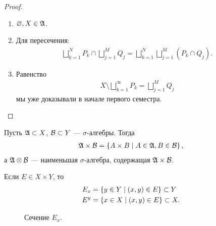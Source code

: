 \begin{proof}\
 \begin{enumerate}
  \item $\varnothing, X \in \mathfrak{A}$.
  \item Для пересечения: \begin{align*}
   \bigsqcup_{k=1}^{N} P_k \cap \bigsqcup_{j=1}^{M} Q_j = \bigsqcup_{k=1}^{N} \bigsqcup_{j=1}^{M} (P_k \cap Q_j)
  .\end{align*} 
 \item Равенство \begin{align*}
  X \setminus \bigsqcup_{k=1}^{\infty} P_k = \bigsqcup_{j=1}^{M} Q_j
 \end{align*} мы уже доказывали в начале первого семестра.
 \end{enumerate}
\end{proof}
\begin{df}
 Пусть $\mathfrak{A} \subset X$, $\mathcal{B} \subset Y$ --- $\sigma$-алгебры. Тогда \begin{align*}
  \mathfrak{A} \times \mathcal{B} = \left\{ A \times B \;\middle|\; A \in \mathfrak{A}, B \in \mathcal{B} \right\}
 ,\end{align*} а $\mathfrak{A} \otimes \mathcal{B}$  --- наименьшая $\sigma$-алгебра, содержащая $\mathfrak{A} \times \mathcal{B}$.

 Если $E \in X \times Y$, то 
\begin{align*}
 E_x &= \left\{ y \in Y \;\middle|\; (x, y) \in E \right\} \subset Y \\
 E^{y} &= \left\{ x \in X \;\middle|\; (x, y) \in E \right\} \subset X
.\end{align*}

\begin{figure}[ht]
    \centering
    \caption{Сечение $E_x$.}
    \label{fig:projections}
\end{figure}

\end{df}

